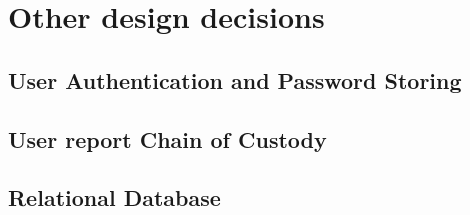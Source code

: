\documentclass[../../DD.tex]{subfiles}
\begin{document}
\section{Other design decisions\label{sect:2.7}}

\subsection{User Authentication and Password Storing\label{2.7.1}}


\subsection{User report Chain of Custody\label{2.7.2}}


\subsection{Relational Database\label{2.7.3}}

\newpage
\end{document}
